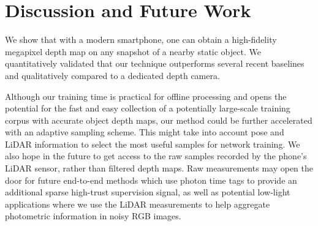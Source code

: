 \section{Discussion and Future Work}
We show that with a modern smartphone, one can obtain a high-fidelity megapixel depth map on any snapshot of a nearby static object. We quantitatively validated that our technique outperforms several recent baselines and qualitatively compared to a dedicated depth camera.

Although our training time is practical for offline processing and opens the potential for the fast and easy collection of a potentially large-scale training corpus with accurate object depth maps, our method could be further accelerated with an adaptive sampling scheme. This might take into account pose and LiDAR information to select the most useful samples for network training. We also hope in the future to get access to the raw samples recorded by the phone's LiDAR sensor, rather than filtered depth maps. Raw measurements may open the door for future end-to-end methods which use photon time tags to provide an additional sparse high-trust supervision signal, as well as potential low-light applications where we use the LiDAR measurements to help aggregate photometric information in noisy RGB images.



